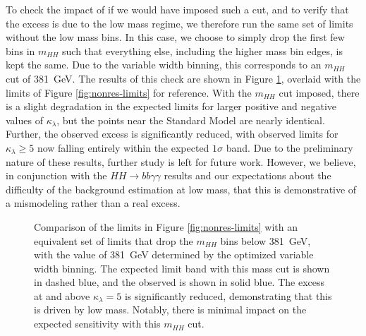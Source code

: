 To check the impact of if we would have imposed such a cut, and to verify that the excess is due to the low mass regime, 
we therefore run the same set of limits without the low mass bins. In this case, we choose to simply drop the 
first few bins in $m_{HH}$ such that everything else, including the higher mass bin edges, is kept the same. Due to 
the variable width binning, this corresponds to an $m_{HH}$ cut of \SI{381}{\GeV}. The results of this check are shown 
in Figure \ref{fig:nonres-limits-with-cut}, overlaid with the limits of Figure \ref{fig:nonres-limits} for reference.
With the $m_{HH}$ cut imposed, there is a slight degradation in the expected limits for larger positive and negative 
values of $\kappa_{\lambda}$, but the points near the Standard Model are nearly identical. Further, the observed excess 
is significantly reduced, with observed limits for $\kappa_{\lambda} \geq 5$ now falling entirely within the expected 
$1\sigma$ band. Due to the preliminary nature of these results, further study is left for future work. However, 
we believe, in conjunction with the $HH\rightarrow bb\gamma\gamma$ results and our expectations about the difficulty 
of the background estimation at low mass, that this is demonstrative of a mismodeling rather than a real excess. 

\begin{figure}[ht]
  \centering
  \caption{\label{fig:nonres-limits-with-cut} Comparison of the limits in Figure \ref{fig:nonres-limits}
  with an equivalent set of limits that drop the $m_{HH}$ bins below \SI{381}{\GeV}, with the value 
  of \SI{381}{\GeV} determined by the optimized variable width binning. The expected limit band with 
  this mass cut is shown in dashed blue, and the observed is shown in solid blue. The excess 
  at and above $\kappa_{\lambda} = 5$ is significantly reduced, demonstrating that this is driven by 
  low mass. Notably, there is minimal impact on the expected sensitivity with this $m_{HH}$ cut.
  }
\end{figure}
